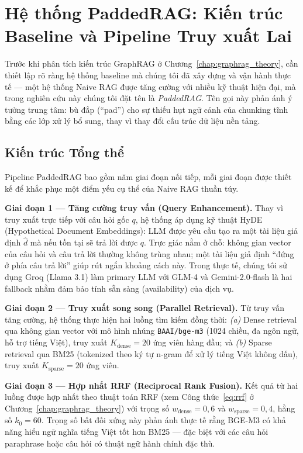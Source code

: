 \documentclass[12pt,a4paper]{report}
\theoremstyle{plain}
\theoremstyle{definition}
\begin{document}
	\section{Hệ thống PaddedRAG: Kiến trúc Baseline và Pipeline Truy xuất Lai}
	\label{sec:paddedrag_baseline}

	Trước khi phân tích kiến trúc GraphRAG ở Chương~\ref{chap:graphrag_theory},
	cần thiết lập rõ ràng hệ thống baseline mà chúng tôi đã xây dựng và vận hành
	thực tế --- một hệ thống Naive RAG được tăng cường với nhiều kỹ thuật hiện đại,
	mà trong nghiên cứu này chúng tôi đặt tên là \emph{PaddedRAG}. Tên gọi này
	phản ánh ý tưởng trung tâm: bù đắp (``pad'') cho sự thiếu hụt ngữ cảnh của
	chunking tĩnh bằng các lớp xử lý bổ sung, thay vì thay đổi cấu trúc dữ liệu
	nền tảng.

	\subsection{Kiến trúc Tổng thể}
	\label{subsec:paddedrag_architecture}

	Pipeline PaddedRAG bao gồm năm giai đoạn nối tiếp, mỗi giai đoạn được thiết
	kế để khắc phục một điểm yếu cụ thể của Naive RAG thuần túy.

	\textbf{Giai đoạn 1 --- Tăng cường truy vấn (Query Enhancement).}
	Thay vì truy xuất trực tiếp với câu hỏi gốc $q$, hệ thống áp dụng kỹ thuật
	HyDE (Hypothetical Document Embeddings): LLM được yêu cầu tạo ra một tài liệu
	giả định $\hat{d}$ mà nếu tồn tại sẽ trả lời được $q$. Trực giác nằm ở
	chỗ: không gian vector của câu hỏi và câu trả lời thường không trùng nhau;
	một tài liệu giả định ``đứng ở phía câu trả lời'' giúp rút ngắn khoảng cách
	này. Trong thực tế, chúng tôi sử dụng Groq (Llama 3.1) làm primary LLM
	với GLM-4 và Gemini-2.0-flash là hai fallback nhằm đảm bảo tính sẵn sàng
	(availability) của dịch vụ.

	\textbf{Giai đoạn 2 --- Truy xuất song song (Parallel Retrieval).}
	Từ truy vấn tăng cường, hệ thống thực hiện hai luồng tìm kiếm đồng thời:
	\emph{(a)} Dense retrieval qua không gian vector với mô hình nhúng
	\texttt{BAAI/bge-m3} (1024 chiều, đa ngôn ngữ, hỗ trợ tiếng Việt), truy
	xuất $K_{\text{dense}} = 20$ ứng viên hàng đầu; và \emph{(b)} Sparse retrieval
	qua BM25 (tokenized theo ký tự n-gram để xử lý tiếng Việt không dấu), truy
	xuất $K_{\text{sparse}} = 20$ ứng viên.

	\textbf{Giai đoạn 3 --- Hợp nhất RRF (Reciprocal Rank Fusion).}
	Kết quả từ hai luồng được hợp nhất theo thuật toán RRF
	(xem Công thức~\eqref{eq:rrf} ở Chương~\ref{chap:graphrag_theory}) với
	trọng số $w_{\text{dense}} = 0{,}6$ và $w_{\text{sparse}} = 0{,}4$, hằng số
	$k_0 = 60$. Trọng số bất đối xứng này phản ánh thực tế rằng BGE-M3 có khả
	năng hiểu ngữ nghĩa tiếng Việt tốt hơn BM25 --- đặc biệt với các câu hỏi
	paraphrase hoặc câu hỏi có thuật ngữ hành chính đặc thù.
\end{document}
